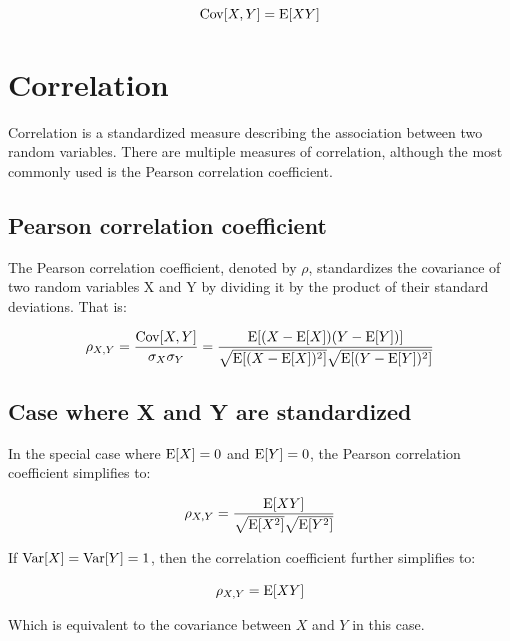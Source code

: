 \documentclass[12pt]{article}
\begin{document}
$$ \mathrm{Cov}[X,Y] = \mathrm{E}[XY] $$

\section{Correlation}

Correlation is a standardized measure describing the association between two random variables.
There are multiple measures of correlation, although the most commonly used is the Pearson correlation coefficient.

\subsection{Pearson correlation coefficient}

The Pearson correlation coefficient, denoted by $\rho$, standardizes the covariance of two random variables X and Y by dividing it by the product of their standard deviations. That is:

$$
\rho_{X,Y} =
\frac{\mathrm{Cov}[X,Y]}{\sigma_X \sigma_Y} =
\frac{\mathrm{E}[(X - \mathrm{E}[X])(Y - \mathrm{E}[Y])]}
{\sqrt{\mathrm{E}[ (X - \mathrm{E}[X])^2]} \sqrt{\mathrm{E}[ (Y - \mathrm{E}[Y])^2]}}
$$

\subsection{Case where X and Y are standardized}

In the special case where $\mathrm{E}[X] = 0$ and $\mathrm{E}[Y] = 0$, the Pearson correlation coefficient simplifies to:

$$ \rho_{X,Y} = \frac{\mathrm{E}[XY]}{\sqrt{\mathrm{E}[X^2]} \sqrt{\mathrm{E}[Y^2]}} $$

If $ \mathrm{Var}[X] = \mathrm{Var}[Y] = 1$, then the correlation coefficient further simplifies to:

$$ \rho_{X,Y} = \mathrm{E}[XY] $$

Which is equivalent to the covariance between $X$ and $Y$ in this case.



\end{document}
